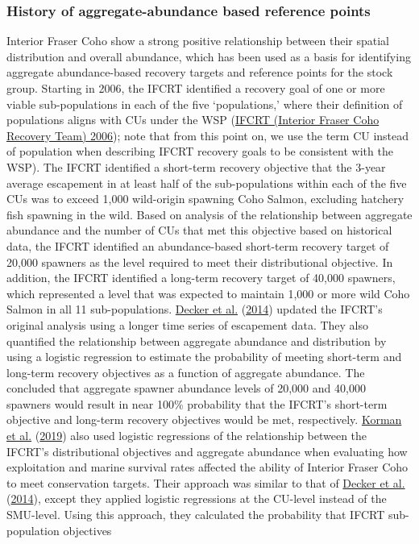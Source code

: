 \documentclass[11pt]{book}
\begin{document}
\hypertarget{history-of-aggregate-abundance-based-reference-points}{%
\subsubsection{History of aggregate-abundance based reference points}\label{history-of-aggregate-abundance-based-reference-points}}

Interior Fraser Coho show a strong positive relationship between their spatial distribution and overall abundance, which has been used as a basis for identifying aggregate abundance-based recovery targets and reference points for the stock group. Starting in 2006, the IFCRT identified a recovery goal of one or more viable sub-populations in each of the five `populations,' where their definition of populations aligns with CUs under the WSP (\protect\hyperlink{ref-ifcrtinteriorfrasercohorecoveryteamConservationStrategyCoho2006}{IFCRT (Interior Fraser Coho Recovery Team) 2006}); note that from this point on, we use the term CU instead of population when describing IFCRT recovery goals to be consistent with the WSP). The IFCRT identified a short-term recovery objective that the 3-year average escapement in at least half of the sub-populations within each of the five CUs was to exceed 1,000 wild-origin spawning Coho Salmon, excluding hatchery fish spawning in the wild. Based on analysis of the relationship between aggregate abundance and the number of CUs that met this objective based on historical data, the IFCRT identified an abundance-based short-term recovery target of 20,000 spawners as the level required to meet their distributional objective. In addition, the IFCRT identified a long-term recovery target of 40,000 spawners, which represented a level that was expected to maintain 1,000 or more wild Coho Salmon in all 11 sub-populations. \protect\hyperlink{ref-deckerAssessmentInteriorFraser2014}{Decker et al.} (\protect\hyperlink{ref-deckerAssessmentInteriorFraser2014}{2014}) updated the IFCRT's original analysis using a longer time series of escapement data. They also quantified the relationship between aggregate abundance and distribution by using a logistic regression to estimate the probability of meeting short-term and long-term recovery objectives as a function of aggregate abundance. The concluded that aggregate spawner abundance levels of 20,000 and 40,000 spawners would result in near 100\% probability that the IFCRT's short-term objective and long-term recovery objectives would be met, respectively. \protect\hyperlink{ref-kormanEvaluationFrameworkAssessing2019}{Korman et al.} (\protect\hyperlink{ref-kormanEvaluationFrameworkAssessing2019}{2019}) also used logistic regressions of the relationship between the IFCRT's distributional objectives and aggregate abundance when evaluating how exploitation and marine survival rates affected the ability of Interior Fraser Coho to meet conservation targets. Their approach was similar to that of \protect\hyperlink{ref-deckerAssessmentInteriorFraser2014}{Decker et al.} (\protect\hyperlink{ref-deckerAssessmentInteriorFraser2014}{2014}), except they applied logistic regressions at the CU-level instead of the SMU-level. Using this approach, they calculated the probability that IFCRT sub-population objectives 
\end{document}
